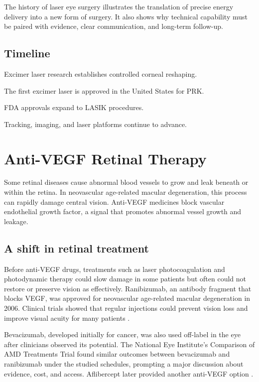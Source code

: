 \documentclass[12pt,oneside]{book}
\begin{document}
The history of laser eye surgery illustrates the translation of precise energy
delivery into a new form of surgery. It also shows why technical capability
must be paired with evidence, clear communication, and long-term follow-up.

\section*{Timeline}
\begin{description}[leftmargin=2.3cm,style=nextline]
  \item[1980s] Excimer laser research establishes controlled corneal reshaping.
  \item[1995] The first excimer laser is approved in the United States for PRK.
  \item[Late 1990s] FDA approvals expand to LASIK procedures.
  \item[2000s onward] Tracking, imaging, and laser platforms continue to advance.
\end{description}
\chapter[Anti-VEGF Retinal Therapy]{Anti-VEGF Retinal Therapy}

Some retinal diseases cause abnormal blood vessels to grow and leak beneath or
within the retina. In neovascular age-related macular degeneration, this
process can rapidly damage central vision. Anti-VEGF medicines block vascular
endothelial growth factor, a signal that promotes abnormal vessel growth and
leakage.

\section{A shift in retinal treatment}
Before anti-VEGF drugs, treatments such as laser photocoagulation and photodynamic therapy could slow damage in some patients but often could not restore or preserve vision as effectively. Ranibizumab, an antibody fragment that blocks VEGF, was approved for neovascular age-related macular degeneration in 2006. Clinical trials showed that regular injections could prevent vision loss and improve visual acuity for many patients \cite{neiAntiVEGF,marinaTrial}.

Bevacizumab, developed initially for cancer, was also used off-label in the
eye after clinicians observed its potential. The National Eye Institute's
Comparison of AMD Treatments Trial found similar outcomes between bevacizumab
and ranibizumab under the studied schedules, prompting a major discussion
about evidence, cost, and access. Aflibercept later provided another anti-VEGF
option \cite{neiAntiVEGF}.
\end{document}
